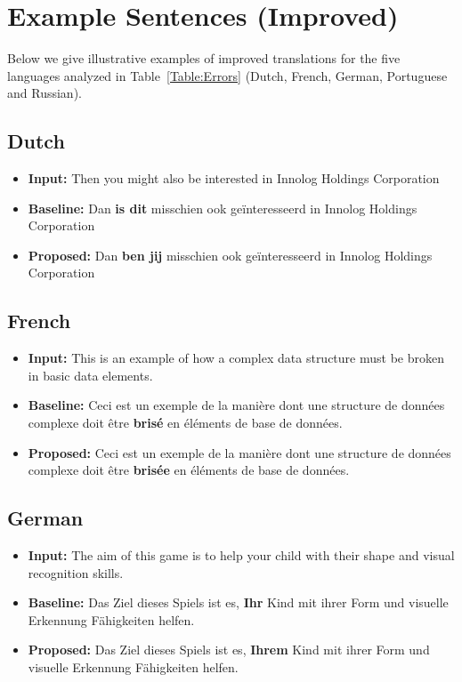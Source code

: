 \documentclass[english]{jnlp_1.4}
\begin{document}
\section{Example Sentences (Improved)}
\label{Appendix:Improved}

Below we give illustrative examples of improved translations for the five languages
analyzed in Table~\ref{Table:Errors} (Dutch, French, German, Portuguese and Russian).
\subsection{Dutch}
\begin{itemize}
    \item \textbf{Input:} Then you might also be interested in Innolog Holdings Corporation
    \item \textbf{Baseline:} Dan {\bf is dit} misschien ook ge\"{i}nteresseerd in Innolog Holdings Corporation
    \item \textbf{Proposed:} Dan {\bf ben jij} misschien ook ge\"{i}nteresseerd in Innolog Holdings Corporation
\end{itemize}
\subsection{French}
\begin{itemize}
    \item \textbf{Input:} This is an example of how a complex data structure must be broken in basic data elements.
    \item \textbf{Baseline:} Ceci est un exemple de la mani\`{e}re dont une structure de donn\'{e}es complexe doit \^{e}tre {\bf bris\'{e}} en \'{e}l\'{e}ments de base de donn\'{e}es.
    \item \textbf{Proposed:} Ceci est un exemple de la mani\`{e}re dont une structure de donn\'{e}es complexe doit \^{e}tre {\bf bris\'{e}e} en \'{e}l\'{e}ments de base de donn\'{e}es.
\end{itemize}
\subsection{German}
\begin{itemize}
    \item \textbf{Input:} The aim of this game is to help your child with their shape and visual recognition skills.
    \item \textbf{Baseline:} Das Ziel dieses Spiels ist es, {\bf Ihr} Kind mit ihrer Form und visuelle Erkennung F\"{a}higkeiten helfen.
    \item \textbf{Proposed:} Das Ziel dieses Spiels ist es, {\bf Ihrem} Kind mit ihrer Form und visuelle Erkennung F\"{a}higkeiten helfen.
\end{itemize}
\end{document}
